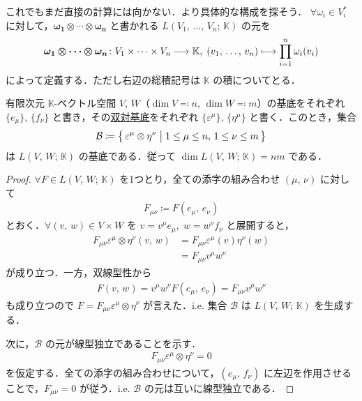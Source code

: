 \documentclass[rep_main]{subfiles}
\begin{document}
これでもまだ直接の計算には向かない．より具体的な構成を探そう．
$\forall \omega_i \in V_i^*$ に対して，$\bm{\omega_1 \otimes \cdots \otimes \omega_n}$ と書かれる $L(V_1,\, \dots,\, V_n;\, \mathbb{K})$ の元を
\begin{align}
	\bm{\omega_1 \otimes \cdots \otimes \omega_n} \colon V_1 \times \cdots \times V_n \longrightarrow \mathbb{K},\; (v_1,\, \dots,\, v_n) \longmapsto \prod_{i=1}^n \omega_i(v_i)
\end{align}
によって定義する．ただし右辺の総積記号は $\mathbb{K}$ の積についてとる．

\begin{myprop}[label=prop:basis-L]{}
	有限次元 $\mathbb{K}$-ベクトル空間 $V,\, W$（$\dim V \eqqcolon n,\, \dim W \eqqcolon m$）の基底をそれぞれ $\{e_\mu\},\, \{f_\nu\}$ と書き，その\hyperref[def.basisforDVS]{双対基底}をそれぞれ $\{\varepsilon^\mu\},\, \{\eta^\mu\}$ と書く．このとき，集合
	\begin{align}
		\mathcal{B} \coloneqq \bigl\{\, \varepsilon^\mu \otimes \eta^\nu \bigm| 1 \le \mu \le n,\, 1 \le \nu \le m \,\bigr\} 
	\end{align}
	は $L(V,\, W;\, \mathbb{K})$ の基底である．従って $\dim L(V,\, W;\, \mathbb{K}) = nm$ である．
\end{myprop}

\begin{proof}
	$\forall F  \in L(V,\, W;\, \mathbb{K})$ を1つとり，全ての添字の組み合わせ $(\mu,\, \nu)$ に対して
	\begin{align}
		F_{\mu\nu} \coloneqq F(e_\mu,\, e_\nu)
	\end{align}
	とおく．$\forall (v,\, w) \in V \times W$ を $v = v^\mu e_\mu,\; w = w^\nu f_\nu$ と展開すると，
	\begin{align}
		F_{\mu\nu} \varepsilon^\mu \otimes \eta^\nu (v,\, w) &= F_{\mu\nu} \varepsilon^{\mu}(v) \eta^\nu(w) \\
		&= F_{\mu\nu} v^\mu w^\nu
	\end{align}
	が成り立つ．一方，双線型性から
	\begin{align}
		F(v,\, w) = v^\mu w^\nu F(e_\mu,\, e_\nu) = F_{\mu\nu} v^\mu w^\nu
	\end{align}
	も成り立つので $F = F_{\mu\nu} \varepsilon^\mu \otimes \eta^\nu$ が言えた．i.e. 集合 $\mathcal{B}$ は $L(V,\, W;\, \mathbb{K})$ を生成する．

	次に，$\mathcal{B}$ の元が線型独立であることを示す．
	\begin{align}
		F_{\mu\nu} \varepsilon^\mu \otimes \eta^\nu = 0
	\end{align}
	を仮定する．全ての添字の組み合わせについて，$(e_\mu,\, f_\nu)$ に左辺を作用させることで，$F_{\mu\nu} = 0$ が従う．i.e. $\mathcal{B}$ の元は互いに線型独立である．
\end{proof}
\end{document}
